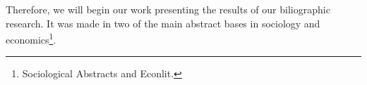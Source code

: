 \documentclass[a4paper, 12pt, openright, oneside, german, french, brazil, english, article]{abntex2}
\begin{document}

	Therefore, we will begin our work presenting the results of our biliographic research. It was made in two of the main abstract bases in sociology and economics\footnote{Sociological Abstracts and Econlit.}.


	

\end{document}
